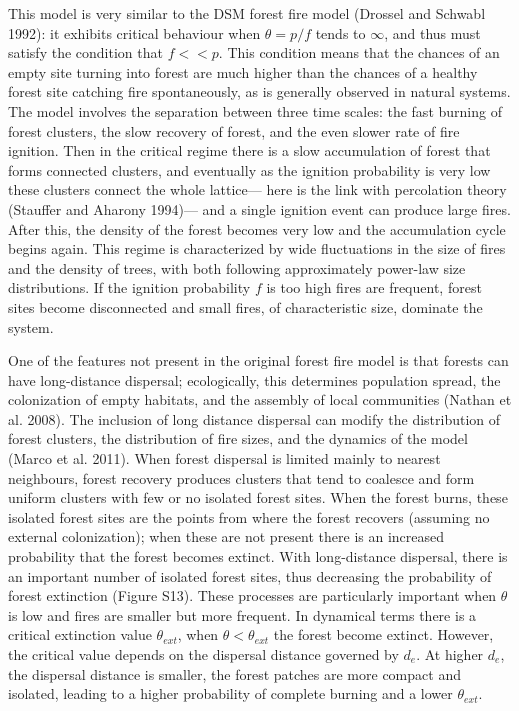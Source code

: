 \documentclass[
]{article}
\begin{document}
This model is very similar to the DSM forest fire model (Drossel and
Schwabl 1992): it exhibits critical behaviour when \(\theta = p/f\)
tends to \(\infty\), and thus must satisfy the condition that
\(f << p\). This condition means that the chances of an empty site
turning into forest are much higher than the chances of a healthy forest
site catching fire spontaneously, as is generally observed in natural
systems. The model involves the separation between three time scales:
the fast burning of forest clusters, the slow recovery of forest, and
the even slower rate of fire ignition. Then in the critical regime there
is a slow accumulation of forest that forms connected clusters, and
eventually as the ignition probability is very low these clusters
connect the whole lattice--- here is the link with percolation theory
(Stauffer and Aharony 1994)--- and a single ignition event can produce
large fires. After this, the density of the forest becomes very low and
the accumulation cycle begins again. This regime is characterized by
wide fluctuations in the size of fires and the density of trees, with
both following approximately power-law size distributions. If the
ignition probability \(f\) is too high fires are frequent, forest sites
become disconnected and small fires, of characteristic size, dominate
the system.

One of the features not present in the original forest fire model is
that forests can have long-distance dispersal; ecologically, this
determines population spread, the colonization of empty habitats, and
the assembly of local communities (Nathan et al. 2008). The inclusion of
long distance dispersal can modify the distribution of forest clusters,
the distribution of fire sizes, and the dynamics of the model (Marco et
al. 2011). When forest dispersal is limited mainly to nearest
neighbours, forest recovery produces clusters that tend to coalesce and
form uniform clusters with few or no isolated forest sites. When the
forest burns, these isolated forest sites are the points from where the
forest recovers (assuming no external colonization); when these are not
present there is an increased probability that the forest becomes
extinct. With long-distance dispersal, there is an important number of
isolated forest sites, thus decreasing the probability of forest
extinction (Figure S13). These processes are particularly important when
\(\theta\) is low and fires are smaller but more frequent. In dynamical
terms there is a critical extinction value \(\theta_{ext}\), when
\(\theta < \theta_{ext}\) the forest become extinct. However, the
critical value depends on the dispersal distance governed by \(d_e\). At
higher \(d_e\), the dispersal distance is smaller, the forest patches
are more compact and isolated, leading to a higher probability of
complete burning and a lower \(\theta_{ext}\).
\end{document}
